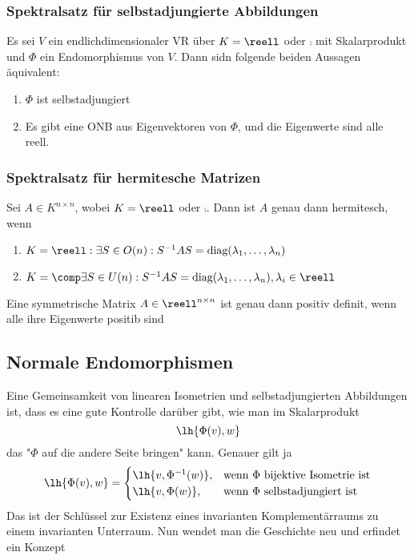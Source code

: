 \documentclass{kit}
\begin{document}
    \subsubsection{Spektralsatz für selbstadjungierte Abbildungen}
      Es sei $V$ ein endlichdimensionaler VR über $K=\reell$ oder $\comp$ mit Skalarprodukt und $\Phi$ ein Endomorphismus
      von $V$. Dann sidn folgende beiden Aussagen äquivalent:
      \begin{enumerate}[label=\roman*)]
        \item $\Phi$ ist selbstadjungiert
        \item Es gibt eine ONB aus Eigenvektoren von $\Phi$, und die Eigenwerte sind alle reell.
      \end{enumerate}
    \subsubsection{Spektralsatz für hermitesche Matrizen}
      Sei $A\in K^{n\times n}$, wobei $K=\reell$ oder $\comp$. Dann ist $A$ genau dann hermitesch, wenn
      \begin{enumerate}[label=\roman*)]
        \item $K=\reell:\exists S\in O(n):S^{-1}AS=\text{diag}(\lambda_1,\dots,\lambda_n)$
        \item $K=\comp\exists S\in U(n):S^{-1}AS=\text{diag}(\lambda_1,\dots,\lambda_n), \lambda_i\in\reell$
      \end{enumerate}
      Eine symmetrische Matrix $A\in\reell^{n\times n}$ ist genau dann positiv definit, wenn alle ihre Eigenwerte
      positib sind
  \subsection{Normale Endomorphismen}
      Eine Gemeinsamkeit von linearen Isometrien und selbstadjungierten Abbildungen ist, dass es eine gute Kontrolle darüber
      gibt, wie man im Skalarprodukt
      $$\lh{\Phi(v),w}$$
      das "$\Phi$ auf die andere Seite bringen" kann. Genauer gilt ja
      $$\lh{\Phi(v),w}=\begin{cases}
        \lh{v,\Phi^{-1}(w)}, & \text{wenn $\Phi$ bijektive Isometrie ist}\\
        \lh{v,\Phi(w)}, & \text{wenn $\Phi$ selbstadjungiert ist}
      \end{cases}$$
      Das ist der Schlüssel zur Existenz eines invarianten Komplementärraums zu einem invarianten Unterraum. Nun wendet man
      die Geschichte neu und erfindet ein Konzept
\end{document}

